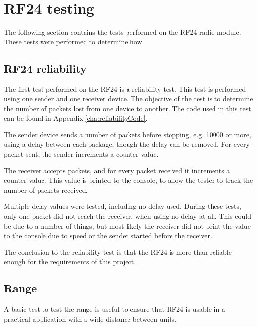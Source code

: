 \section{RF24 testing}
The following section contains the tests performed on the RF24 radio module. These tests were performed to determine how 

\subsection{RF24 reliability}
The first test performed on the RF24 is a reliability test. This test is performed using one sender and one receiver device. The objective of the test is to determine the number of packets lost from one device to another. 
The code used in this test can be found in Appendix \ref{cha:reliabilityCode}.


The sender device sends a number of packets before stopping, e.g. 10000 or more, using a delay between each package, though the delay can be removed. For every packet sent, the sender increments a counter value.

The receiver accepts packets, and for every packet received it increments a counter value. This value is printed to the console, to allow the tester to track the number of packets received.

Multiple delay values were tested, including no delay used. During these tests, only one packet did not reach the receiver, when using no delay at all. This could be due to a number of things, but most likely the receiver did not print the value to the console due to speed or the sender started before the receiver.

The conclusion to the reliability test is that the RF24 is more than reliable enough for the requirements of this project.



\subsection{Range}
A basic test to test the range is useful to ensure that RF24 is usable in a practical application with a wide distance between units.

